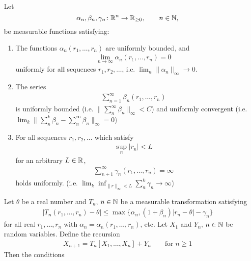 \begin{thm}\label{dvoretzky thm}
    Let 
    \[
        \alpha_n, \beta_n,\gamma_n\colon \mathbb{R}^n \to \mathbb{R}_{\ge 0}, \qquad n\in\mathbb{N},
    \] 
    be measurable functions satisfying:
    \begin{enumerate}
        \item The functions \(\alpha_n(r_1,\dots,r_n) \) are uniformly bounded, and 
        \begin{align}\label{alpha_n property}
            \lim_{n\to\infty}\alpha_n(r_1,\dots,r_n)=0
        \end{align}
        uniformly for all sequences \(r_1,r_2,\dots\), i.e. \(\lim_n \|\alpha_n\|_\infty \to 0\).
        \item The series
        \begin{align}\label{beta_n property}
            \sum_{n=1}^\infty \beta_n(r_1,\dots, r_n)
        \end{align}
        is uniformly bounded (i.e. \(\|\sum_n^\infty \beta_n\|_\infty<C\)) and uniformly convergent (i.e. \(\lim_k\| \sum_n^k\beta_n -\sum^\infty_n\beta_n\|_\infty=0  \))
        \item For all sequences \(r_1,r_2,\dots \) which satisfy
        \begin{align}\label{sup r_n < L}
            \sup_n |r_n| < L
        \end{align}
        for an arbitrary \(L\in\mathbb{R}\),
        \begin{align}\label{gamma_n property}
            \sum_{n+1}^\infty \gamma_n(r_1,\dots,r_n)=\infty
        \end{align}
        holds uniformly. (i.e. \(\lim_k \inf_{\|r\|_\infty < L}  \sum^k_n \gamma_n \to \infty \))
    \end{enumerate}
    Let \(\theta\) be a real number and \(T_n\), \(n\in\mathbb{N}\) be a measurable transformation satisfying
    \begin{align}
        |T_n(r_1,\dots,r_n)-\theta| \le \max\{\alpha_n, (1+\beta_n)|r_n -\theta| -\gamma_n\} \label{dvoretzky: main condition}
    \end{align}
    for all real \(r_1,\dots,r_n\) with \(\alpha_n=\alpha_n(r_1,\dots,r_n)\), etc. Let \(X_1\) and \(Y_n\), \(n\in\mathbb{N}\) be random variables. Define the recursion
    \begin{align}
        X_{n+1}=T_n[X_1,\dots,X_n] +Y_n \qquad \text{for }n\ge 1
    \end{align}
    Then the conditions
    \begin{enumerate}

\end{enumerate}
\end{thm}
